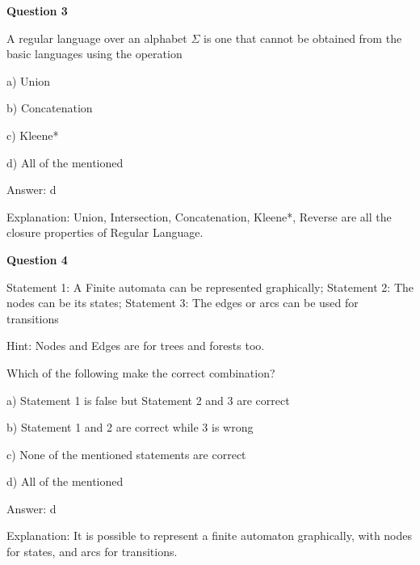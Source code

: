 \documentclass{article}
\begin{document}
\begin{mdframed}[linewidth=1pt, roundcorner=5pt, linecolor=gray!30, backgroundcolor=gray!5]
\textbf{Question 3} 

A regular language over an alphabet $\Sigma$ is one that cannot be obtained from the basic languages using the operation

a) Union

b) Concatenation

c) Kleene*

d) All of the mentioned
\vspace{5pt} \par
\begin{tcolorbox}[colback=green!5, colframe=green!40!black, title=Solution]
Answer: d

Explanation: Union, Intersection, Concatenation, Kleene*, Reverse are all the closure properties of Regular Language.
\end{tcolorbox}
\end{mdframed}
\newpage

\begin{mdframed}[linewidth=1pt, roundcorner=5pt, linecolor=gray!30, backgroundcolor=gray!5]
\textbf{Question 4} 

Statement 1: A Finite automata can be represented graphically; Statement 2: The nodes can be its states;   Statement 3: The edges or arcs can be used for transitions

Hint: Nodes and Edges are for trees and forests too.

Which of the following make the correct combination?

a) Statement 1 is false but Statement 2 and 3 are correct

b) Statement 1 and 2 are correct while 3 is wrong

c) None of the mentioned statements are correct

d) All of the mentioned
\vspace{5pt} \par
\begin{tcolorbox}[colback=green!5, colframe=green!40!black, title=Solution]
Answer: d

Explanation: It is possible to represent a finite automaton graphically, with nodes for states, and arcs for transitions.
\end{tcolorbox}
\end{mdframed}
\end{document}
